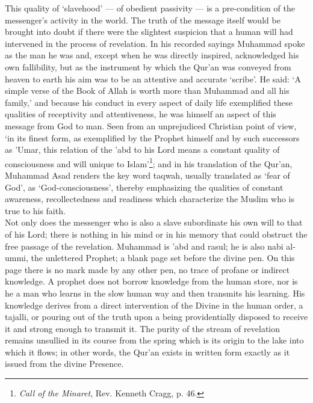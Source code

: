 \documentclass[10pt, twoside,openright]{book}
\begin{document}
This quality of `slavehood' --- of obedient passivity --- is a pre-condition of the messenger's activity 
in the world. The truth of the message itself would be brought into doubt if there were the slightest 
suspicion that a human will had intervened in the process of revelation. In his recorded sayings 
Muhammad spoke as the man he was and, except when he was directly inspired, acknowledged his own 
fallibility, but as the instrument by which the Qur'an was conveyed from heaven to earth his aim was 
to be an attentive and accurate `scribe'. He said: `A simple verse of the Book of Allah is worth more 
than Muhammad and all his family,' and because his conduct in every aspect of daily life exemplified 
these qualities of receptivity and attentiveness, he was himself an aspect of this message from God 
to man. Seen from an unprejudiced Christian point of view, `in its finest form, as exemplified by the 
Prophet himself and by such successors as 'Umar, this relation of the 'abd to his Lord means a 
constant quality of consciousness and will unique to Islam'\footnote{\emph{Call of the Minaret}, Rev. Kenneth Cragg, p. 46.}; and in his translation of the Qur'an, Muhammad Asad renders the key word taqwah, usually translated as `fear of God', as `God\hyp{}consciousness', thereby emphasizing the qualities of constant awareness, recollectedness and readiness which characterize the Muslim who is true to his faith. \\

Not only does the messenger who is also a slave subordinate his own will to that of his Lord; there 
is nothing in his mind or in his memory that could obstruct the free passage of the revelation. 
Muhammad is 'abd and rasul; he is also nabi al\hyp{}ummi, the unlettered Prophet; a blank page set before 
the divine pen. On this page there is no mark made by any other pen, no trace of profane or indirect 
knowledge. A prophet does not borrow knowledge from the human store, nor is he a man who learns in 
the slow human way and then transmits his learning. His knowledge derives from a direct intervention 
of the Divine in the human order, a tajalli, or pouring out of the truth upon a being providentially 
disposed to receive it and strong enough to transmit it. The purity of the stream of revelation 
remains unsullied in its course from the spring which is its origin to the lake into which it flows; 
in other words, the Qur'an exists in written form exactly as it issued from the divine Presence. \\
\end{document}
